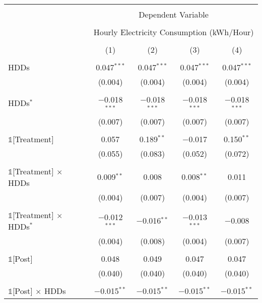 
\begin{table}[!htbp] \centering 
  \label{Table:Breakdown-of-Average-Treatement-Effects_By-Tariff_19-to-20} 
\scriptsize
\begin{tabular}{@{\extracolsep{30pt}}lcccc} 
\\[-1.8ex]\hline 
\hline \\[-1.8ex] 
 & \multicolumn{4}{c}{Dependent Variable} \\ 
\cline{2-5} 
\\[-1.8ex] & \multicolumn{4}{c}{Hourly Electricity Consumption  (kWh/Hour)} \\ 
\\[-1.8ex] & (1) & (2) & (3) & (4)\\ 
\hline \\[-1.8ex] 
 HDDs & 0.047$^{***}$ & 0.047$^{***}$ & 0.047$^{***}$ & 0.047$^{***}$ \\ 
  & (0.004) & (0.004) & (0.004) & (0.004) \\ 
  & & & & \\ 
 HDDs$^{*}$ & $-$0.018$^{***}$ & $-$0.018$^{***}$ & $-$0.018$^{***}$ & $-$0.018$^{***}$ \\ 
  & (0.007) & (0.007) & (0.007) & (0.007) \\ 
  & & & & \\ 
 $\mathbb{1}$[Treatment] & 0.057 & 0.189$^{**}$ & $-$0.017 & 0.150$^{**}$ \\ 
  & (0.055) & (0.083) & (0.052) & (0.072) \\ 
  & & & & \\ 
 $\mathbb{1}$[Treatment] $\times$ HDDs & 0.009$^{**}$ & 0.008 & 0.008$^{**}$ & 0.011 \\ 
  & (0.004) & (0.007) & (0.004) & (0.007) \\ 
  & & & & \\ 
 $\mathbb{1}$[Treatment] $\times$ HDDs$^{*}$ & $-$0.012$^{***}$ & $-$0.016$^{**}$ & $-$0.013$^{***}$ & $-$0.008 \\ 
  & (0.004) & (0.008) & (0.004) & (0.007) \\ 
  & & & & \\ 
 $\mathbb{1}$[Post] & 0.048 & 0.049 & 0.047 & 0.047 \\ 
  & (0.040) & (0.040) & (0.040) & (0.040) \\ 
  & & & & \\ 
 $\mathbb{1}$[Post] $\times$ HDDs & $-$0.015$^{**}$ & $-$0.015$^{**}$ & $-$0.015$^{**}$ & $-$0.015$^{**}$ \\ 

\end{tabular}
\end{table}
